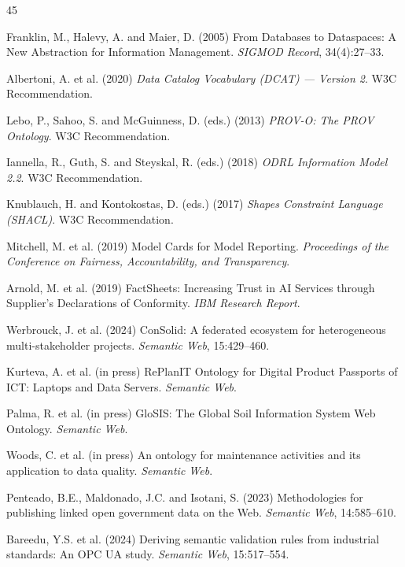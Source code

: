 \documentclass[Afour,sagev,times]{sagej}
\begin{document}
\begin{thebibliography}{45}

 Franklin, M., Halevy, A. and Maier, D. (2005) From Databases to Dataspaces: A New Abstraction for Information Management. \emph{SIGMOD Record}, 34(4):27--33.

 Albertoni, A. et al. (2020) \emph{Data Catalog Vocabulary (DCAT) --- Version 2}. W3C Recommendation.

 Lebo, P., Sahoo, S. and McGuinness, D. (eds.) (2013) \emph{PROV-O: The PROV Ontology}. W3C Recommendation.

 Iannella, R., Guth, S. and Steyskal, R. (eds.) (2018) \emph{ODRL Information Model 2.2}. W3C Recommendation.

 Knublauch, H. and Kontokostas, D. (eds.) (2017) \emph{Shapes Constraint Language (SHACL)}. W3C Recommendation.

 Mitchell, M. et al. (2019) Model Cards for Model Reporting. \emph{Proceedings of the Conference on Fairness, Accountability, and Transparency}.

 Arnold, M. et al. (2019) FactSheets: Increasing Trust in AI Services through Supplier's Declarations of Conformity. \emph{IBM Research Report}.

 Werbrouck, J. et al. (2024) ConSolid: A federated ecosystem for heterogeneous multi-stakeholder projects. \emph{Semantic Web}, 15:429--460.

 Kurteva, A. et al. (in press) RePlanIT Ontology for Digital Product Passports of ICT: Laptops and Data Servers. \emph{Semantic Web}.

 Palma, R. et al. (in press) GloSIS: The Global Soil Information System Web Ontology. \emph{Semantic Web}.

 Woods, C. et al. (in press) An ontology for maintenance activities and its application to data quality. \emph{Semantic Web}.

 Penteado, B.E., Maldonado, J.C. and Isotani, S. (2023) Methodologies for publishing linked open government data on the Web. \emph{Semantic Web}, 14:585--610.

 Bareedu, Y.S. et al. (2024) Deriving semantic validation rules from industrial standards: An OPC UA study. \emph{Semantic Web}, 15:517--554.


\end{thebibliography}
\end{document}
